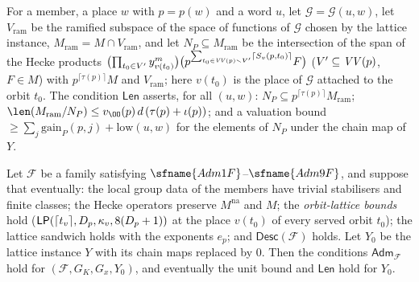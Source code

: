 \begin{definition}\label{pf:linkG:admg1}
For a member, a place $w$ with $p=p(w)$ and a word $u$, let $\mathcal G=\mathcal G(u,w)$, let $V_{\mathrm{ram}}$ be the
ramified subspace of the space of functions of $\mathcal G$ chosen by the lattice instance, $M_{\mathrm{ram}}=M\cap
V_{\mathrm{ram}}$, and let $N_P\subseteq M_{\mathrm{ram}}$ be the intersection of the span of the Hecke products
$\bigl(\prod_{t_0\in V'}y_{v(t_0)}^m\bigr)\bigl(p^{\sum_{t_0\in\mathit{VV}(p)\smallsetminus V'}\lceil S_v(p,t_0)\rceil}F\bigr)$
($V'\subseteq\mathit{VV}(p)$, $F\in M$) with $p^{\lceil\tau(p)\rceil}M$ and $V_{\mathrm{ram}}$; here $v(t_0)$ is the place of
$\mathcal G$ attached to the orbit $t_0$. The condition $\mathsf{Len}$ asserts, for all $(u,w)$: $N_P\subseteq
p^{\lceil\tau(p)\rceil}M_{\mathrm{ram}}$; $\len(M_{\mathrm{ram}}/N_P)\le v_\OO(p)\,d\,(\tau(p)+\iota(p))$; and a valuation
bound $\ge\sum_j\mathrm{gain}_P(p,j)+\mathrm{low}(u,w)$ for the elements of $N_P$ under the chain map of $Y$.
\end{definition}

\begin{proposition}\label{pf:linkG:afnk}
Let $\mathcal F$ be a family satisfying $\sfname{Adm1F}$--$\sfname{Adm9F}$, and suppose that eventually: the local group
data of the members have trivial stabilisers and finite classes; the Hecke operators preserve $M^{\mathrm{na}}$ and $M$;
the \emph{orbit-lattice bounds} hold ($\mathsf{LP}(\lceil t_v\rceil,D_p,\kappa_v,8(D_p+1))$ at the place $v(t_0)$ of every
served orbit $t_0$); the lattice sandwich holds with the exponents $e_p$; and $\mathsf{Desc}(\mathcal F)$ holds. Let
$Y_0$ be the lattice instance $Y$ with its chain maps replaced by $0$. Then the conditions $\mathsf{Adm}_{\mathcal F}$ hold for
$(\mathcal F,G_K,G_x,Y_0)$, and eventually the unit bound and $\mathsf{Len}$ hold for $Y_0$.
\end{proposition}

